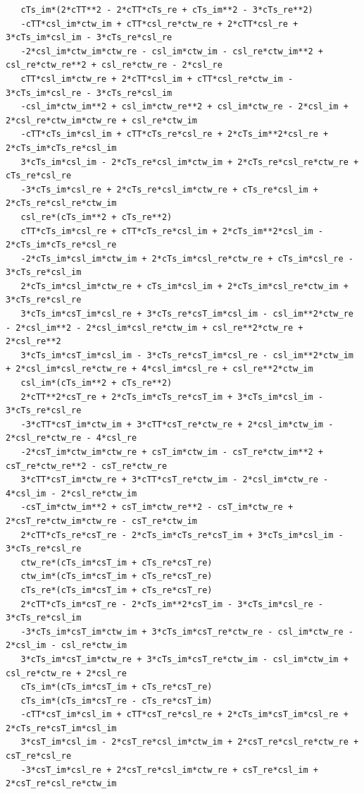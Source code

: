 \documentclass[
  10pt,
]{article}
\begin{document}
\begin{verbatim}
   cTs_im*(2*cTT**2 - 2*cTT*cTs_re + cTs_im**2 - 3*cTs_re**2)
   -cTT*csl_im*ctw_im + cTT*csl_re*ctw_re + 2*cTT*csl_re + 3*cTs_im*csl_im - 3*cTs_re*csl_re
   -2*csl_im*ctw_im*ctw_re - csl_im*ctw_im - csl_re*ctw_im**2 + csl_re*ctw_re**2 + csl_re*ctw_re - 2*csl_re
   cTT*csl_im*ctw_re + 2*cTT*csl_im + cTT*csl_re*ctw_im - 3*cTs_im*csl_re - 3*cTs_re*csl_im
   -csl_im*ctw_im**2 + csl_im*ctw_re**2 + csl_im*ctw_re - 2*csl_im + 2*csl_re*ctw_im*ctw_re + csl_re*ctw_im
   -cTT*cTs_im*csl_im + cTT*cTs_re*csl_re + 2*cTs_im**2*csl_re + 2*cTs_im*cTs_re*csl_im
   3*cTs_im*csl_im - 2*cTs_re*csl_im*ctw_im + 2*cTs_re*csl_re*ctw_re + cTs_re*csl_re
   -3*cTs_im*csl_re + 2*cTs_re*csl_im*ctw_re + cTs_re*csl_im + 2*cTs_re*csl_re*ctw_im
   csl_re*(cTs_im**2 + cTs_re**2)
   cTT*cTs_im*csl_re + cTT*cTs_re*csl_im + 2*cTs_im**2*csl_im - 2*cTs_im*cTs_re*csl_re
   -2*cTs_im*csl_im*ctw_im + 2*cTs_im*csl_re*ctw_re + cTs_im*csl_re - 3*cTs_re*csl_im
   2*cTs_im*csl_im*ctw_re + cTs_im*csl_im + 2*cTs_im*csl_re*ctw_im + 3*cTs_re*csl_re
   3*cTs_im*csT_im*csl_re + 3*cTs_re*csT_im*csl_im - csl_im**2*ctw_re - 2*csl_im**2 - 2*csl_im*csl_re*ctw_im + csl_re**2*ctw_re + 2*csl_re**2
   3*cTs_im*csT_im*csl_im - 3*cTs_re*csT_im*csl_re - csl_im**2*ctw_im + 2*csl_im*csl_re*ctw_re + 4*csl_im*csl_re + csl_re**2*ctw_im
   csl_im*(cTs_im**2 + cTs_re**2)
   2*cTT**2*csT_re + 2*cTs_im*cTs_re*csT_im + 3*cTs_im*csl_im - 3*cTs_re*csl_re
   -3*cTT*csT_im*ctw_im + 3*cTT*csT_re*ctw_re + 2*csl_im*ctw_im - 2*csl_re*ctw_re - 4*csl_re
   -2*csT_im*ctw_im*ctw_re + csT_im*ctw_im - csT_re*ctw_im**2 + csT_re*ctw_re**2 - csT_re*ctw_re
   3*cTT*csT_im*ctw_re + 3*cTT*csT_re*ctw_im - 2*csl_im*ctw_re - 4*csl_im - 2*csl_re*ctw_im
   -csT_im*ctw_im**2 + csT_im*ctw_re**2 - csT_im*ctw_re + 2*csT_re*ctw_im*ctw_re - csT_re*ctw_im
   2*cTT*cTs_re*csT_re - 2*cTs_im*cTs_re*csT_im + 3*cTs_im*csl_im - 3*cTs_re*csl_re
   ctw_re*(cTs_im*csT_im + cTs_re*csT_re)
   ctw_im*(cTs_im*csT_im + cTs_re*csT_re)
   cTs_re*(cTs_im*csT_im + cTs_re*csT_re)
   2*cTT*cTs_im*csT_re - 2*cTs_im**2*csT_im - 3*cTs_im*csl_re - 3*cTs_re*csl_im
   -3*cTs_im*csT_im*ctw_im + 3*cTs_im*csT_re*ctw_re - csl_im*ctw_re - 2*csl_im - csl_re*ctw_im
   3*cTs_im*csT_im*ctw_re + 3*cTs_im*csT_re*ctw_im - csl_im*ctw_im + csl_re*ctw_re + 2*csl_re
   cTs_im*(cTs_im*csT_im + cTs_re*csT_re)
   cTs_im*(cTs_im*csT_re - cTs_re*csT_im)
   -cTT*csT_im*csl_im + cTT*csT_re*csl_re + 2*cTs_im*csT_im*csl_re + 2*cTs_re*csT_im*csl_im
   3*csT_im*csl_im - 2*csT_re*csl_im*ctw_im + 2*csT_re*csl_re*ctw_re + csT_re*csl_re
   -3*csT_im*csl_re + 2*csT_re*csl_im*ctw_re + csT_re*csl_im + 2*csT_re*csl_re*ctw_im

\end{verbatim}
\end{document}
